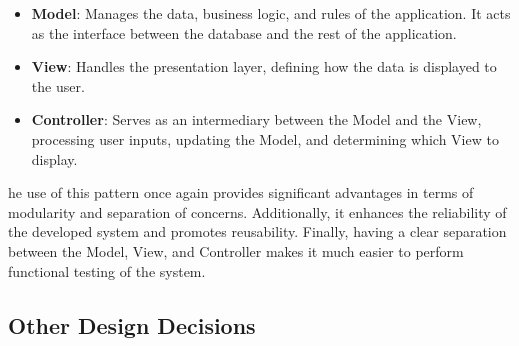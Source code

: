 			\begin{itemize}
				\item \textbf{Model}: Manages the data, business logic, and rules of the application. It acts as the interface between the database and the rest of the application.
				\item \textbf{View}: Handles the presentation layer, defining how the data is displayed to the user.
				\item \textbf{Controller}: Serves as an intermediary between the Model and the View, processing user inputs, updating the Model, and determining which View to display.
				
				
			\end{itemize}
			
			he use of this pattern once again provides significant advantages in terms of modularity and separation of concerns. Additionally, it enhances the reliability of the developed system and promotes reusability. Finally, having a clear separation between the Model, View, and Controller makes it much easier to perform functional testing of the system.
		
		\subsection{Other Design Decisions}
			
			
			
			
			
			
			
			
			
			
			